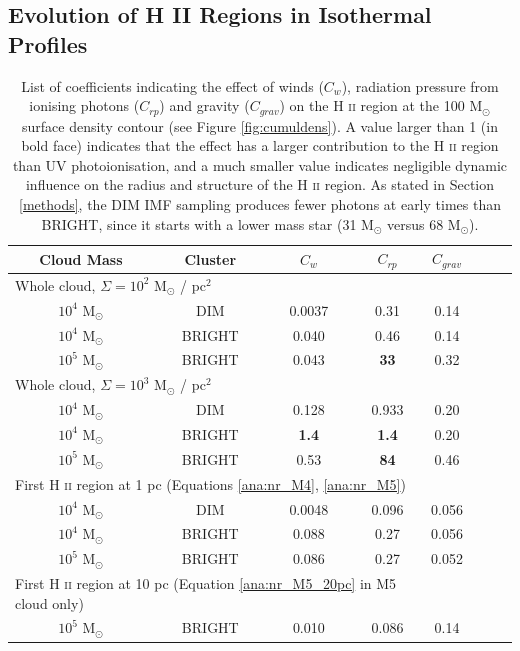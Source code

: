 \documentclass[a4paper,fleqn,usenatbib]{mnras}
\newcommand{\Msolar}{M$_{\odot}$\xspace}
\newcommand{\Msolarpc}{M$_{\odot}$ / pc$^{2}$\xspace}
\newcommand{\HII}{H \textsc{ii}\xspace}
\begin{document}
\subsection{Evolution of H II Regions in Isothermal Profiles}
\label{ana:HIIregioniso}

\begin{table}
	\centering
	\caption{List of coefficients indicating the effect of winds ($C_w$), radiation pressure from ionising photons ($C_{rp}$) and gravity ($C_{grav}$) on the \HII region at the 100 \Msolar surface density contour (see Figure \protect\ref{fig:cumuldens}). A value larger than 1 (in bold face) indicates that the effect has a larger contribution to the \HII region than UV photoionisation, and a much smaller value indicates negligible dynamic influence on the radius and structure of the \HII region. As stated in Section \protect\ref{methods}, the DIM IMF sampling produces fewer photons at early times than BRIGHT, since it starts with a lower mass star (31 \Msolar versus 68 \Msolar).}
	\label{ana:CwCrpCg}
	\begin{tabular}{cccccccc} %
		\textbf{Cloud Mass}    & \textbf{Cluster} & $C_w$    & $C_{rp}$ & $C_{grav}$ \\
		\hline
		\multicolumn{4}{l}{Whole cloud, $\Sigma = 10^2$ \protect\Msolarpc} \\
		\hline
		$10^4$ \Msolar  & DIM     & 0.0037 & 0.31     & 0.14       \\
		$10^4$ \Msolar  & BRIGHT  & 0.040  & 0.46     & 0.14       \\
		$10^5$ \Msolar  & BRIGHT  & 0.043  & \textbf{33}       & 0.32       \\
		\hline
		\multicolumn{4}{l}{Whole cloud, $\Sigma = 10^3$ \protect\Msolarpc} \\
		\hline
		$10^4$ \Msolar  & DIM     & 0.128  & 0.933    & 0.20       \\
		$10^4$ \Msolar  & BRIGHT  & \textbf{1.4}    & \textbf{1.4}      & 0.20       \\
		$10^5$ \Msolar  & BRIGHT  & 0.53   & \textbf{84}       & 0.46       \\
		\hline
		\multicolumn{4}{l}{First \protect\HII region at 1 pc (Equations \protect\ref{ana:nr_M4}, \protect\ref{ana:nr_M5})} \\
		\hline
		$10^4$ \Msolar  & DIM     & 0.0048 & 0.096    & 0.056      \\
		$10^4$ \Msolar  & BRIGHT  & 0.088  & 0.27     & 0.056      \\
		$10^5$ \Msolar  & BRIGHT  & 0.086  & 0.27     & 0.052      \\
		\hline
		\multicolumn{4}{l}{First \protect\HII region at 10 pc (Equation \protect\ref{ana:nr_M5_20pc} in M5 cloud only)} \\
		\hline
		$10^5$ \Msolar  & BRIGHT  & 0.010  & 0.086     & 0.14      \\
		
	\end{tabular}
\end{table}
\end{document}
